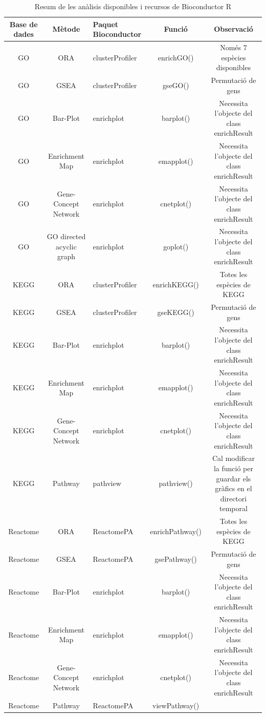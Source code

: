 \documentclass[]{article}
\begin{document}
\begin{table}[H]
\begin{adjustbox}{width=1\textwidth}
\small
\begin{tabular}{|| c | c | l | c | c ||} 
\hline
Base de dades & Mètode & Paquet Bioconductor & Funció & Observació \\ [0.5ex] 
\hline\hline
GO & ORA & clusterProfiler & enrichGO() & Només 7 espècies disponibles \\ 
\hline
GO & GSEA & clusterProfiler & gseGO() & Permutació de gens \\
\hline
GO & Bar-Plot & enrichplot & barplot() & Necessita l'objecte del class enrichResult \\
\hline
GO & Enrichment Map & enrichplot & emapplot() & Necessita l'objecte del class enrichResult \\
\hline
GO & Gene-Concept Network & enrichplot & cnetplot() & Necessita l'objecte del class enrichResult \\
\hline
GO & GO directed acyclic graph & enrichplot & goplot() & Necessita l'objecte del class enrichResult \\
\hline\hline
KEGG & ORA & clusterProfiler & enrichKEGG() & Totes les espècies de KEGG \\ 
\hline
KEGG & GSEA & clusterProfiler & gseKEGG() & Permutació de gens \\
\hline
KEGG & Bar-Plot & enrichplot & barplot() & Necessita l'objecte del class enrichResult \\
\hline
KEGG & Enrichment Map & enrichplot & emapplot() & Necessita l'objecte del class enrichResult \\
\hline
KEGG & Gene-Concept Network & enrichplot & cnetplot() & Necessita l'objecte del class enrichResult \\
\hline
KEGG & Pathway & pathview & pathview() & Cal modificar la funció per guardar els gràfics en el directori temporal \\
\hline\hline
Reactome & ORA & ReactomePA & enrichPathway() & Totes les espècies de KEGG \\ 
\hline
Reactome & GSEA & ReactomePA & gsePathway() & Permutació de gens \\
\hline
Reactome & Bar-Plot & enrichplot & barplot() & Necessita l'objecte del class enrichResult \\
\hline
Reactome & Enrichment Map & enrichplot & emapplot() & Necessita l'objecte del class enrichResult \\
\hline
Reactome & Gene-Concept Network & enrichplot & cnetplot() & Necessita l'objecte del class enrichResult \\
\hline
Reactome & Pathway & ReactomePA & viewPathway() &  \\
\hline
\hline
\end{tabular}
\end{adjustbox}
\caption{Resum de les anàlisis disponibles i recursos de Bioconductor R} 
\end{table}
\end{document}
